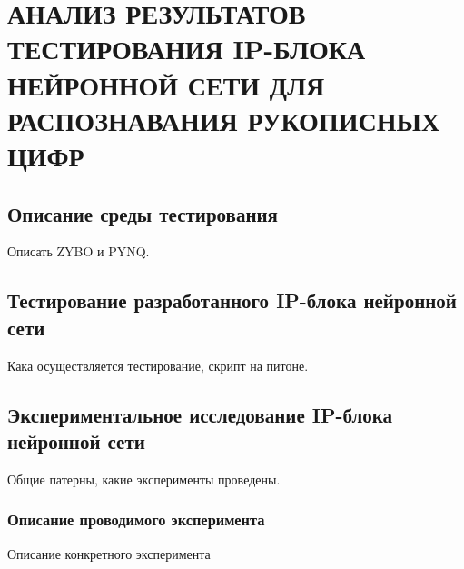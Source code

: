 \chapter[Анализ результатов тестирования IP-блока нейронной сети для распознавания рукописных цифр]
{АНАЛИЗ РЕЗУЛЬТАТОВ ТЕСТИРОВАНИЯ IP-БЛОКА НЕЙРОННОЙ СЕТИ ДЛЯ РАСПОЗНАВАНИЯ РУКОПИСНЫХ ЦИФР}

\section{Описание среды тестирования}\par
\hspace*{12.5 mm}Описать ZYBO и PYNQ.\@

\section{Тестирование разработанного IP-блока нейронной сети}\par
\hspace*{12.5 mm}Кака осуществляется тестирование, скрипт на питоне.

\section{Экспериментальное исследование IP-блока нейронной сети}\par
\hspace*{12.5 mm}Общие патерны, какие эксперименты проведены.

\subsection{Описание проводимого эксперимента}\par
\hspace*{12.5 mm}Описание конкретного эксперимента

